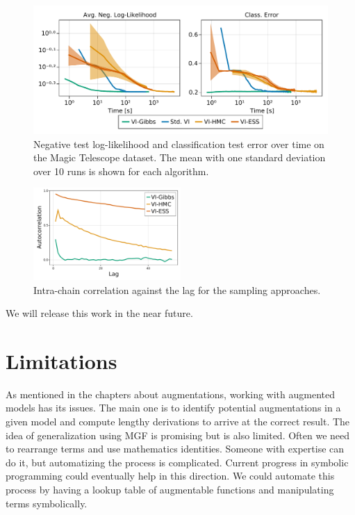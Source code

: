 \begin{figure}[H]
    \centering
    \includegraphics[width=\textwidth]{./chapters/8_discussions/figures/magictelescope.pdf}
    \caption{Negative test log-likelihood and classification test error over time on the Magic Telescope dataset.
    The mean with one standard deviation over 10 runs is shown for each algorithm.
    }
    \label{fig:magictelescope}
\end{figure}

\begin{figure}[H]
    \centering
    \includegraphics[width=0.5\textwidth]{./chapters/8_discussions/figures/magictelescope_autocor.pdf}
    \caption{Intra-chain correlation against the lag for the sampling approaches.}
    \label{fig:magictelescope_autocor}
\end{figure}

We will release this work in the near future.

\section{Limitations}

As mentioned in the chapters about augmentations, working with augmented models has its issues.
The main one is to identify potential augmentations in a given model and compute lengthy derivations to arrive at the correct result.
The idea of generalization using \ac{MGF}  is promising but is also limited.
Often we need to rearrange terms and use mathematics identities.
Someone with expertise can do it, but automatizing the process is complicated.
Current progress in symbolic programming could eventually help in this direction.
We could automate this process by having a lookup table of augmentable functions and manipulating terms symbolically.

